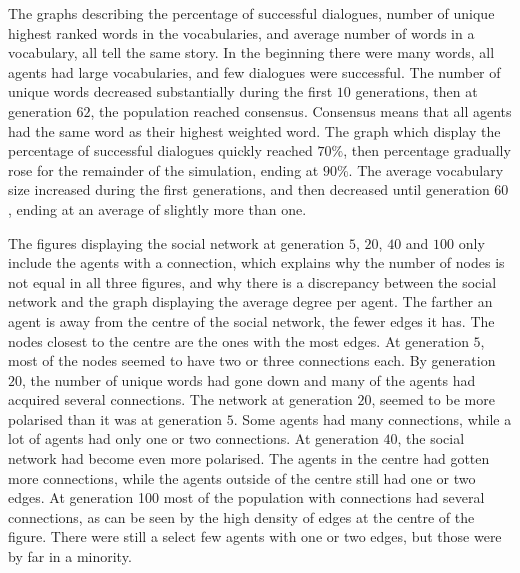 The graphs describing the percentage of successful dialogues, number of unique highest ranked words in the vocabularies, and average number of words in a vocabulary, all tell the same story. In the beginning there were many words, all agents had large vocabularies, and few dialogues were successful. The number of unique words decreased substantially during the first $10$ generations, then at generation $62$, the population reached consensus. Consensus means that all agents had the same word as their highest weighted word. The graph which display the percentage of successful dialogues quickly reached $70\%$, then percentage gradually rose for the remainder of the simulation, ending at $90\%$. The average vocabulary size increased during the first generations, and then decreased until generation $60$, ending at an average of slightly more than one.

The figures displaying the social network at generation $5$, $20$, $40$ and $100$ only include the agents with a connection, which explains why the number of nodes is not equal in all three figures, and why there is a discrepancy between the social network and the graph displaying the average degree per agent. The farther an agent is away from the centre of the social network, the fewer edges it has. The nodes closest to the centre are the ones with the most edges. At generation $5$, most of the nodes seemed to have two or three connections each. By generation $20$, the number of unique words had gone down and many of the agents had acquired several connections. The network at generation $20$, seemed to be more polarised than it was at generation $5$. Some agents had many connections, while a lot of agents had only one or two connections. At generation $40$, the social network had become even more polarised. The agents in the centre had gotten more connections, while the agents outside of the centre still had one or two edges. At generation 100 most of the population with connections had several connections, as can be seen by the high density of edges at the centre of the figure. There were still a select few agents with one or two edges, but those were by far in a minority.

